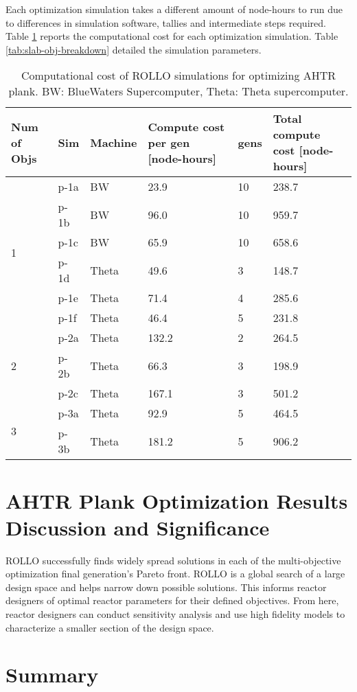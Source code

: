 Each optimization simulation takes a different amount of node-hours to run due to 
differences in simulation software, tallies and intermediate steps required. 
Table \ref{tab:plank-compute-cost} reports the computational cost for each optimization 
simulation. 
Table \ref{tab:slab-obj-breakdown} detailed the simulation parameters.
\begin{table}[htbp!]
    \centering
    \onehalfspacing
    \caption{Computational cost of \acrfull{ROLLO} simulations for optimizing \acrfull{AHTR}
    plank. BW: BlueWaters Supercomputer, Theta: Theta supercomputer.}
	\label{tab:plank-compute-cost}
    \footnotesize
    \begin{tabular}{p{1.4cm}|p{1cm}lp{4cm}lp{4cm}}
    \hline 
    \textbf{Num of Objs} & \textbf{Sim} & \textbf{Machine} & \textbf{Compute cost per gen [node-hours]} &\textbf{gens} & \textbf{Total compute cost [node-hours]} \\
    \hline
    \multirow{6}{2cm}{1} 
    & p-1a & BW & 23.9 & 10 & 238.7 \\
    & p-1b & BW & 96.0 & 10 & 959.7 \\
    & p-1c & BW & 65.9 & 10 & 658.6 \\
    & p-1d & Theta & 49.6 & 3 & 148.7 \\
    & p-1e & Theta & 71.4 & 4 & 285.6 \\
    & p-1f & Theta & 46.4 & 5 & 231.8 \\
    \hline
    \multirow{3}{2cm}{2}
    & p-2a & Theta & 132.2 & 2 & 264.5 \\
    & p-2b & Theta & 66.3 & 3 & 198.9 \\
    & p-2c & Theta & 167.1 & 3 & 501.2 \\
    \hline
    \multirow{2}{2cm}{3}
    & p-3a & Theta & 92.9 & 5 & 464.5 \\
    & p-3b & Theta & 181.2 & 5 & 906.2 \\
    \hline
    \end{tabular}
\end{table}

\section{AHTR Plank Optimization Results Discussion and Significance}
\label{sec:plank-discussion}
\gls{ROLLO} successfully finds widely spread solutions in each of the multi-objective 
optimization final generation's Pareto front.
\gls{ROLLO} is a global search of a large design space and helps narrow down possible 
solutions.
This informs reactor designers of optimal reactor parameters for their defined objectives.  
From here, reactor designers can conduct sensitivity analysis and use high fidelity 
models to characterize a smaller section of the design space.

\section{Summary}